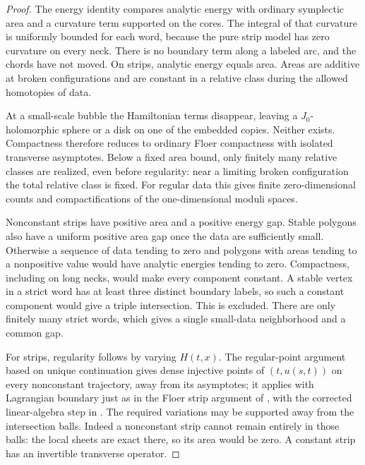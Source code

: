 \begin{proof}
The energy identity compares analytic energy with ordinary symplectic
area and a curvature term supported on the cores.  The integral of
that curvature is uniformly bounded for each word, because the pure
strip model has zero curvature on every neck.  There is no boundary
term along a labeled arc, and the chords have not moved.  On strips,
analytic energy equals area.  Areas are additive at broken
configurations and are constant in a relative class during the
allowed homotopies of data.

At a small-scale bubble the Hamiltonian terms disappear, leaving a
$J_0$-holomorphic sphere or a disk on one of the embedded copies.
Neither exists.  Compactness therefore reduces to ordinary Floer
compactness with isolated transverse asymptotes.  Below a fixed area
bound, only finitely many relative classes are realized, even before
regularity: near a limiting broken configuration the total relative
class is fixed.  For regular data this gives finite zero-dimensional
counts and compactifications of the one-dimensional moduli spaces.

Nonconstant strips have positive area and a positive energy gap.
Stable polygons also have a uniform positive area gap once the data
are sufficiently small.  Otherwise a sequence of data tending to
zero and polygons with areas tending to a nonpositive value would
have analytic energies tending to zero.  Compactness, including on
long necks, would make every component constant.  A stable vertex in
a strict word has at least three distinct boundary labels, so such
a constant component would give a triple intersection.  This is
excluded.  There are only finitely many strict words, which gives a
single small-data neighborhood and a common gap.

For strips, regularity follows by varying $H(t,x)$.  The regular-point
argument based on unique continuation gives dense injective points
of $(t,u(s,t))$ on every nonconstant trajectory, away from its
asymptotes; it applies with Lagrangian boundary just as in the Floer
strip argument of \cite{FloerHoferSalamon}, with the corrected
linear-algebra step in \cite{FloerHoferSalamonErratum}.
The required variations
may be supported away from the intersection balls.  Indeed a
nonconstant strip cannot remain entirely in those balls: the local
sheets are exact there, so its area would be zero.  A constant strip
has an invertible transverse operator.


\end{proof}
